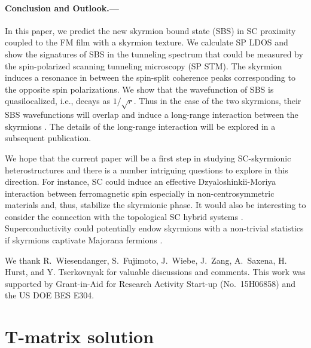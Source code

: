 \documentclass[twocolumn,showpacs,floatfix,longbibliography]{revtex4-1}
\begin{document}
\paragraph*{Conclusion and Outlook.---} \label{sec:conclusion}

In this paper, we predict the new skyrmion bound state (SBS) in SC proximity coupled to the FM film with a skyrmion texture. We calculate SP LDOS and show the signatures of SBS in the tunneling spectrum that could be measured by the spin-polarized scanning tunneling microscopy (SP STM). The skyrmion induces a resonance in between the spin-split coherence peaks corresponding to the opposite spin polarizations. We show that the wavefunction of SBS is quasilocalized, i.e., decays as $1/\sqrt{r}$. Thus in the case of the two skyrmions, their SBS wavefunctions will overlap and induce a long-range interaction between the skyrmions \cite{Yao2014,Menard2015}. The details of the long-range interaction will be explored in a subsequent publication.

We hope that the current paper will be a first step in studying SC-skyrmionic heterostructures and there is a number intriguing questions to explore in this direction. For instance, SC could induce an effective Dzyaloshinkii-Moriya interaction between ferromagnetic spin especially in non-centrosymmetric materials and, thus, stabilize the skyrmionic phase. It would also be interesting to consider the connection with the topological SC hybrid systems \cite{Alicea2012}. Superconductivity could potentially endow skyrmions with a non-trivial statistics if skyrmions captivate Majorana fermions \cite{Kim2015}.

We thank  R.~Wiesendanger, S.~Fujimoto, J.~Wiebe, J.~Zang, A.~Saxena, H. Hurst, and Y. Tserkovnyak for valuable discussions and comments. This work was supported by Grant-in-Aid for Research Activity Start-up (No.~15H06858) and the US DOE BES E304.

\newpage




\appendix

\section{T-matrix solution} \label{sec:appendixTMatrix}
\end{document}
